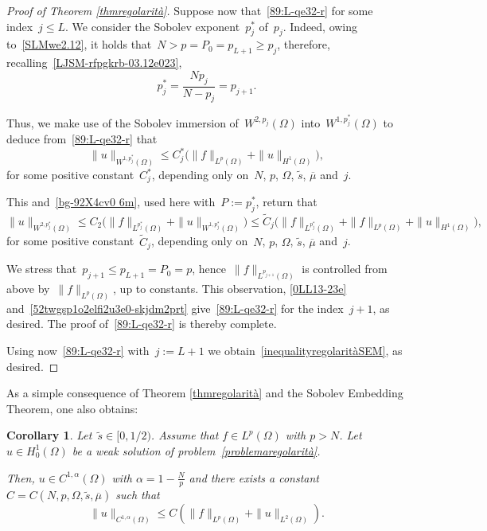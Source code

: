\documentclass[12pt,a4paper,intlimits,sumlimits]{amsart}
\theoremstyle{definition}
\theoremstyle{plain}
\newtheorem{corollary}[definition]{Corollary}
\numberwithin{equation}{section}
\renewcommand{\leq}{\leqslant}
\renewcommand{\le}{\leqslant}
\renewcommand{\ge}{\geqslant}
\begin{document}
\begin{proof}[Proof of Theorem \ref{thmregolarità}]
Suppose now that~\eqref{89:L-qe32-r} for some index~$j\le L$.
We consider the Sobolev exponent~$p_j^*$ of~$p_j$. Indeed,
owing to~\eqref{SLMwe2.12},
it holds that~$N>p=P_0= p_{L+1}\ge p_j$,  therefore, recalling~\eqref{LJSM-rfpgkrb-03.12e023},
\begin{equation}\label{52twgsp1o2elfi2u3e0-skjdm2prt}
p_j^*=\frac{Np_j}{N-p_j}=p_{j+1}.\end{equation}

Thus, we make use of
the Sobolev immersion of~$W^{2,p_j}(\Omega)$
into~$W^{1,p_j^*}(\Omega)$ to deduce from~\eqref{89:L-qe32-r} that
\begin{equation*} 
\|u\|_{W^{1,p_j^*}(\Omega)}\leq C_j^*\Big(
\|f\|_{L^p(\Omega)}+\|u\|_{H^1(\Omega)}\Big),
\end{equation*}for some positive constant~$C_j^*$, depending only on~$N$, $p$, $\Omega$,
$\widetilde s$, $\overline\mu$ and~$j$.

This and~\eqref{bg-92X4cv0 6m}, used here with~$P:=p_j^*$, return that
\begin{equation}\label{0LL13-23e}
\|u\|_{W^{2,p_j^*}(\Omega)}\leq C_2\Big(
\|f\|_{L^{p_j^*}(\Omega)}+\|u\|_{W^{1,p_j^*}(\Omega)}\Big)
\le \widetilde C_j\Big(\|f\|_{L^{p_j^*}(\Omega)}+
\|f\|_{L^p(\Omega)}+\|u\|_{H^1(\Omega)}\Big),
\end{equation}for some positive constant~$\widetilde C_j$, depending only on~$N$, $p$, $\Omega$,
$\widetilde s$, $\overline\mu$ and~$j$. 

We stress that~$p_{j+1}\le p_{L+1}=P_0= p$, hence~$\|f\|_{L^{p_{j+1}}(\Omega)}$
is controlled from above by~$\|f\|_{L^{p}(\Omega)}$, up to constants.
This observation, \eqref{0LL13-23e} and~\eqref{52twgsp1o2elfi2u3e0-skjdm2prt}
give~\eqref{89:L-qe32-r} for the index~$j+1$, as desired.
The proof of~\eqref{89:L-qe32-r} is thereby complete.

Using now~\eqref{89:L-qe32-r} with~$j:=L+1$
we obtain~\eqref{inequalityregolaritàSEM}, as desired.
\end{proof}

As a simple consequence of Theorem \ref{thmregolarità}
and the Sobolev Embedding Theorem, one also obtains:

\begin{corollary}\label{corregolarità}
Let~$\widetilde s\in[0,1/2)$. Assume that $f\in L^p(\Omega)$ with $p>N$. Let $u\in H^1_0(\Omega)$ be a weak solution of problem~\eqref{problemaregolarità}.

Then, $u\in C^{1,\alpha}(\Omega)$ with $\alpha=1-\frac{N}{p}$ and
there exists a constant $C=C(N,p,\Omega,\widetilde s,\overline\mu)$ such that
\begin{equation}\label{inequalityregolaritàcor}
\|u\|_{C^{1,\alpha}(\Omega)}\leq 
C(\|f\|_{L^p(\Omega)}+\|u\|_{L^2(\Omega)}).
\end{equation}
\end{corollary}
\end{document}
